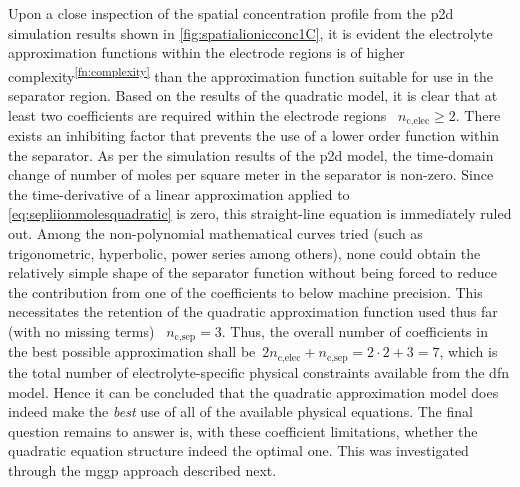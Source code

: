 Upon a close inspection of the  spatial concentration profile from the \gls{p2d}
simulation  results shown  in \cref{fig:spatialionicconc1C},  it is  evident the
electrolyte approximation  functions within the  electrode regions is  of higher
complexity\textsuperscript{\ref{fn:complexity}} than  the approximation function
suitable  for  use  in  the  separator  region. Based  on  the  results  of  the
quadratic  model, it  is  clear  that at  least  two  coefficients are  required
within the  electrode regions \ie~${n_{\text{c,elec}}  \ge 2}$. There  exists an
inhibiting  factor that  prevents  the  use of  a  lower  order function  within
the  separator. As  per  the  simulation results  of  the  \gls{p2d} model,  the
time-domain  change  of number  of  moles  per  square  meter in  the  separator
is  non-zero.  Since  the  time-derivative   of  a  linear  approximation  applied
to  \cref{eq:sepliionmolesquadratic} is  zero,  this  straight-line equation  is
immediately ruled out. Among the  non-polynomial mathematical curves tried (such
as trigonometric, hyperbolic, power series  among others), none could obtain the
relatively simple shape of the separator function without being forced to reduce
the  contribution from  one  of  the coefficients  to  below machine  precision.
This necessitates  the retention  of the  quadratic approximation  function used
thus  far  (with  no  missing  terms)  \ie~${n_\text{c,sep}  =  3}$.  Thus,  the
overall number of  coefficients in the best possible  approximation shall be~${2
n_\text{c,elec} + n_\text{c,sep} = 2\cdot2 + 3  = 7}$, which is the total number
of electrolyte-specific physical constraints available from the \gls{dfn} model.
Hence it  can be concluded  that the  quadratic approximation model  does indeed
make the \emph{best}  use of all of the available  physical equations. The final
question remains to  answer is, with these coefficient  limitations, whether the
quadratic  equation structure  indeed  the optimal  one.  This was  investigated
through the \gls{mggp} approach described next.


